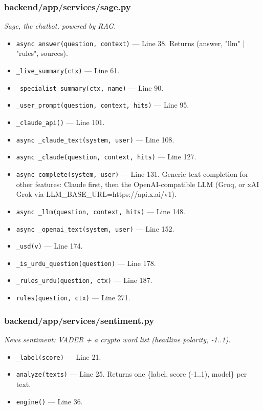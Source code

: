 \subsubsection*{backend/app/services/sage.py}
\textit{Sage, the chatbot, powered by RAG.}
\begin{itemize}[nosep,leftmargin=1.5em]
\item \texttt{async answer(\allowbreak{}question,\allowbreak{} context)} --- Line 38. Returns (answer, "llm" | "rules", sources).
\item \texttt{\_\allowbreak{}live\_\allowbreak{}summary(\allowbreak{}ctx)} --- Line 61.
\item \texttt{\_\allowbreak{}specialist\_\allowbreak{}summary(\allowbreak{}ctx,\allowbreak{} name)} --- Line 90.
\item \texttt{\_\allowbreak{}user\_\allowbreak{}prompt(\allowbreak{}question,\allowbreak{} context,\allowbreak{} hits)} --- Line 95.
\item \texttt{\_\allowbreak{}claude\_\allowbreak{}api(\allowbreak{})} --- Line 101.
\item \texttt{async \_\allowbreak{}claude\_\allowbreak{}text(\allowbreak{}system,\allowbreak{} user)} --- Line 108.
\item \texttt{async \_\allowbreak{}claude(\allowbreak{}question,\allowbreak{} context,\allowbreak{} hits)} --- Line 127.
\item \texttt{async complete(\allowbreak{}system,\allowbreak{} user)} --- Line 131. Generic text completion for other features: Claude first, then the OpenAI-compatible LLM (Groq, or xAI Grok via LLM\_BASE\_URL=https://api.x.ai/v1).
\item \texttt{async \_\allowbreak{}llm(\allowbreak{}question,\allowbreak{} context,\allowbreak{} hits)} --- Line 148.
\item \texttt{async \_\allowbreak{}openai\_\allowbreak{}text(\allowbreak{}system,\allowbreak{} user)} --- Line 152.
\item \texttt{\_\allowbreak{}usd(\allowbreak{}v)} --- Line 174.
\item \texttt{\_\allowbreak{}is\_\allowbreak{}urdu\_\allowbreak{}question(\allowbreak{}question)} --- Line 178.
\item \texttt{\_\allowbreak{}rules\_\allowbreak{}urdu(\allowbreak{}question,\allowbreak{} ctx)} --- Line 187.
\item \texttt{rules(\allowbreak{}question,\allowbreak{} ctx)} --- Line 271.
\end{itemize}
\subsubsection*{backend/app/services/sentiment.py}
\textit{News sentiment: VADER + a crypto word list (headline polarity, -1..1).}
\begin{itemize}[nosep,leftmargin=1.5em]
\item \texttt{\_\allowbreak{}label(\allowbreak{}score)} --- Line 21.
\item \texttt{analyze(\allowbreak{}texts)} --- Line 25. Returns one \{label, score (-1..1), model\} per text.
\item \texttt{engine(\allowbreak{})} --- Line 36.
\end{itemize}

